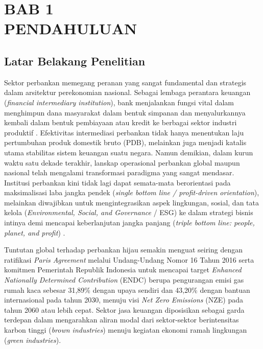 \documentclass[12pt,a4paper]{article}
\numberwithin{equation}{section}
\begin{document}
\section*{BAB 1\\[0.3cm]PENDAHULUAN}
\setcounter{section}{1}
\setcounter{subsection}{0}

\subsection{Latar Belakang Penelitian}

\noindent
Sektor perbankan memegang peranan yang sangat fundamental dan strategis dalam arsitektur perekonomian nasional. Sebagai lembaga perantara keuangan (\emph{financial intermediary institution}), bank menjalankan fungsi vital dalam menghimpun dana masyarakat dalam bentuk simpanan dan menyalurkannya kembali dalam bentuk pembiayaan atau kredit ke berbagai sektor industri produktif \citep{KuncoroSuhardjono2018, GurleyShaw1960}. Efektivitas intermediasi perbankan tidak hanya menentukan laju pertumbuhan produk domestik bruto (PDB), melainkan juga menjadi katalis utama stabilitas sistem keuangan suatu negara. Namun demikian, dalam kurun waktu satu dekade terakhir, lanskap operasional perbankan global maupun nasional telah mengalami transformasi paradigma yang sangat mendasar. Institusi perbankan kini tidak lagi dapat semata-mata berorientasi pada maksimalisasi laba jangka pendek (\emph{single bottom line / profit-driven orientation}), melainkan diwajibkan untuk mengintegrasikan aspek lingkungan, sosial, dan tata kelola (\emph{Environmental, Social, and Governance} / ESG) ke dalam strategi bisnis intinya demi mencapai keberlanjutan jangka panjang (\emph{triple bottom line: people, planet, and profit}) \citep{Freeman2010, Buallay2019}.

\noindent
Tuntutan global terhadap perbankan hijau semakin menguat seiring dengan ratifikasi \emph{Paris Agreement} melalui Undang-Undang Nomor 16 Tahun 2016 serta komitmen Pemerintah Republik Indonesia untuk mencapai target \emph{Enhanced Nationally Determined Contribution} (ENDC) berupa pengurangan emisi gas rumah kaca sebesar 31,89\% dengan upaya sendiri dan 43,20\% dengan bantuan internasional pada tahun 2030, menuju visi \emph{Net Zero Emissions} (NZE) pada tahun 2060 atau lebih cepat. Sektor jasa keuangan diposisikan sebagai garda terdepan dalam mengarahkan aliran modal dari sektor-sektor berintensitas karbon tinggi (\emph{brown industries}) menuju kegiatan ekonomi ramah lingkungan (\emph{green industries}).
\end{document}
